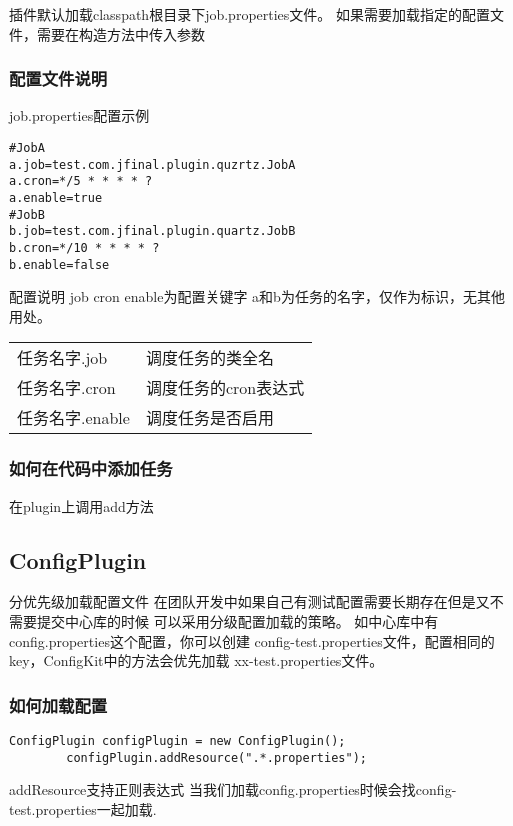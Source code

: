 \documentclass{scrartcl}
\begin{document}
  插件默认加载classpath根目录下job.properties文件。
  如果需要加载指定的配置文件，需要在构造方法中传入参数
\subsubsection{配置文件说明}
\label{sec-2-4-3}

job.properties配置示例

\begin{verbatim}
#JobA
a.job=test.com.jfinal.plugin.quzrtz.JobA
a.cron=*/5 * * * * ?
a.enable=true
#JobB
b.job=test.com.jfinal.plugin.quartz.JobB
b.cron=*/10 * * * * ?
b.enable=false
\end{verbatim}
配置说明
job cron enable为配置关键字
a和b为任务的名字，仅作为标识，无其他用处。


\begin{tabular}{ll}
 任务名字.job     &  调度任务的类全名      \\
 任务名字.cron    &  调度任务的cron表达式  \\
 任务名字.enable  &  调度任务是否启用      \\
\end{tabular}


       
\subsubsection{如何在代码中添加任务}
\label{sec-2-4-4}

    在plugin上调用add方法
\subsection{ConfigPlugin}
\label{sec-2-5}

   分优先级加载配置文件
   在团队开发中如果自己有测试配置需要长期存在但是又不需要提交中心库的时候 
可以采用分级配置加载的策略。 如中心库中有config.properties这个配置，你可以创建 config-test.properties文件，配置相同的key，ConfigKit中的方法会优先加载 xx-test.properties文件。
\subsubsection{如何加载配置}
\label{sec-2-5-1}



\begin{verbatim}
ConfigPlugin configPlugin = new ConfigPlugin();
        configPlugin.addResource(".*.properties");
\end{verbatim}
addResource支持正则表达式
当我们加载config.properties时候会找config-test.properties一起加载.
\end{document}
